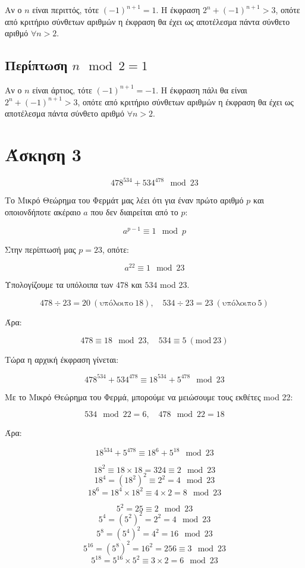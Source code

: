 \documentclass[11pt, oneside]{article}   	%
\begin{document}
 Αν ο $n$ είναι περιττός, τότε $(-1)^{n+1}=1$.
 Η έκφραση $2^n + (-1)^{n+1} > 3$, οπότε από κριτήριο σύνθετων αριθμών η έκφραση θα έχει ως αποτέλεσμα πάντα σύνθετο αριθμό $\forall n>2$.
 
 \subsection{Περίπτωση $n \mod 2 = 1$}
 
 Αν ο $n$ είναι άρτιος, τότε $(-1)^{n+1}=-1$.
 Η έκφραση πάλι θα είναι $2^n + (-1)^{n+1} > 3$, οπότε από κριτήριο σύνθετων αριθμών η έκφραση θα έχει ως αποτέλεσμα πάντα σύνθετο αριθμό $\forall n>2$.
 
 \section{Άσκηση 3}
 
 \[
 478^{534} + 534^{478} \mod 23
 \]
 
 Το Μικρό Θεώρημα του Φερμάτ μας λέει ότι για έναν πρώτο αριθμό \( p \) και οποιονδήποτε ακέραιο \( a \) που δεν διαιρείται από το \( p \):
 
 \[
 a^{p-1} \equiv 1 \mod p
 \]
 
 Στην περίπτωσή μας \( p = 23 \), οπότε:
 
 \[
 a^{22} \equiv 1 \mod 23
 \]
 
 Υπολογίζουμε τα υπόλοιπα των \( 478 \) και \( 534 \) mod 23.
 
 \[
 478 \div 23 = 20 \ (\text{υπόλοιπο} \ 18), \quad 534 \div 23 = 23 \ (\text{υπόλοιπο} \ 5)
 \]
 
 Άρα:
 
 \[
 478 \equiv 18 \mod 23, \quad 534 \equiv 5 \ (\text{mod} \ 23)
 \]
 
 Τώρα η αρχική έκφραση γίνεται:
 
 \[
 478^{534} + 534^{478} \equiv 18^{534} + 5^{478} \mod 23
 \]
 
 Με το Μικρό Θεώρημα του Φερμά, μπορούμε να μειώσουμε τους εκθέτες mod 22:
 
 \[
 534 \mod 22 = 6, \quad 478 \mod 22 = 18
 \]
 
 Άρα:
 
 \[
 18^{534} + 5^{478} \equiv 18^6 + 5^{18} \mod 23
 \]
 
 \[
 18^2 \equiv 18 \times 18 = 324 \equiv 2 \mod 23
 \]
 \[
 18^4 = (18^2)^2 \equiv 2^2 = 4 \mod 23
 \]
 \[
 18^6 = 18^4 \times 18^2 \equiv 4 \times 2 = 8 \mod 23
 \]
 
 \[
 5^2 = 25 \equiv 2 \mod 23
 \]
 \[
 5^4 = (5^2)^2 = 2^2 = 4 \mod 23
 \]
 \[
 5^8 = (5^4)^2 = 4^2 = 16 \mod 23
 \]
 \[
 5^{16} = (5^8)^2 = 16^2 = 256 \equiv 3 \mod 23
 \]
 \[
 5^{18} = 5^{16} \times 5^2 \equiv 3 \times 2 = 6 \mod 23
 \]
 
\end{document}
